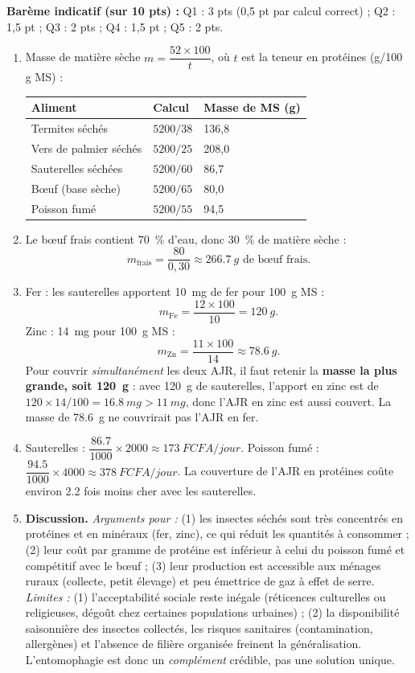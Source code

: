 \documentclass[11pt]{article}
\begin{document}
\begin{corrige}
\textbf{Barème indicatif (sur 10 pts) :} Q1 : 3 pts (0,5 pt par calcul correct) ; Q2 : 1,5 pt ; Q3 : 2 pts ; Q4 : 1,5 pt ; Q5 : 2 pts.

\begin{enumerate}
\item Masse de matière sèche $m = \dfrac{52 \times 100}{t}$, où $t$ est la teneur en protéines (g/100 g MS) :
\begin{center}
\begin{tabularx}{\linewidth}{|l|X|X|}\hline
\rowcolor{popblueL} \textbf{Aliment} & \textbf{Calcul} & \textbf{Masse de MS (g)} \\ \hline
Termites séchés & $5200/38$ & 136,8 \\ \hline
Vers de palmier séchés & $5200/25$ & 208,0 \\ \hline
Sauterelles séchées & $5200/60$ & 86,7 \\ \hline
Bœuf (base sèche) & $5200/65$ & 80,0 \\ \hline
Poisson fumé & $5200/55$ & 94,5 \\ \hline
\end{tabularx}
\end{center}
\item Le bœuf frais contient \SI{70}{\percent} d'eau, donc \SI{30}{\percent} de matière sèche :
\[ m_{\text{frais}} = \frac{80}{0,30} \approx \SI{266,7}{g} \text{ de bœuf frais}. \]
\item Fer : les sauterelles apportent \SI{10}{mg} de fer pour \SI{100}{g} MS :
\[ m_{\text{Fe}} = \frac{12 \times 100}{10} = \SI{120}{g}. \]
Zinc : \SI{14}{mg} pour \SI{100}{g} MS :
\[ m_{\text{Zn}} = \frac{11 \times 100}{14} \approx \SI{78,6}{g}. \]
Pour couvrir \emph{simultanément} les deux AJR, il faut retenir la \textbf{masse la plus grande, soit \SI{120}{g}} : avec \SI{120}{g} de sauterelles, l'apport en zinc est de $120 \times 14/100 = \SI{16,8}{mg} > \SI{11}{mg}$, donc l'AJR en zinc est aussi couvert. La masse de \SI{78,6}{g} ne couvrirait pas l'AJR en fer.
\item Sauterelles : $\dfrac{\num{86,7}}{1000} \times 2000 \approx \SI{173}{FCFA/jour}$. Poisson fumé : $\dfrac{\num{94,5}}{1000} \times 4000 \approx \SI{378}{FCFA/jour}$. La couverture de l'AJR en protéines coûte environ \num{2,2} fois moins cher avec les sauterelles.
\item \textbf{Discussion.} \emph{Arguments pour :} (1) les insectes séchés sont très concentrés en protéines et en minéraux (fer, zinc), ce qui réduit les quantités à consommer ; (2) leur coût par gramme de protéine est inférieur à celui du poisson fumé et compétitif avec le bœuf ; (3) leur production est accessible aux ménages ruraux (collecte, petit élevage) et peu émettrice de gaz à effet de serre. \emph{Limites :} (1) l'acceptabilité sociale reste inégale (réticences culturelles ou religieuses, dégoût chez certaines populations urbaines) ; (2) la disponibilité saisonnière des insectes collectés, les risques sanitaires (contamination, allergènes) et l'absence de filière organisée freinent la généralisation. L'entomophagie est donc un \emph{complément} crédible, pas une solution unique.

\end{enumerate}
\end{corrige}
\end{document}
